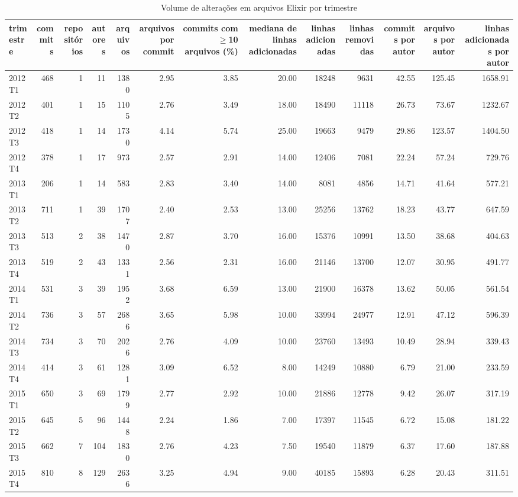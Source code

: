 \begin{table}[htbp]
\centering
\caption{Volume de alterações em arquivos Elixir por trimestre}
\label{tab:volume_trimestres}
\begin{tabular}{lrrrrrrrrrrrr}
\toprule
trimestre & commits & repositórios & autores & arquivos & arquivos por commit & commits com $\geq$10 arquivos (\%) & mediana de linhas adicionadas & linhas adicionadas & linhas removidas & commits por autor & arquivos por autor & linhas adicionadas por autor \\
\midrule
2012T1 & 468 & 1 & 11 & 1380 & 2.95 & 3.85 & 20.00 & 18248 & 9631 & 42.55 & 125.45 & 1658.91 \\
2012T2 & 401 & 1 & 15 & 1105 & 2.76 & 3.49 & 18.00 & 18490 & 11118 & 26.73 & 73.67 & 1232.67 \\
2012T3 & 418 & 1 & 14 & 1730 & 4.14 & 5.74 & 25.00 & 19663 & 9479 & 29.86 & 123.57 & 1404.50 \\
2012T4 & 378 & 1 & 17 & 973 & 2.57 & 2.91 & 14.00 & 12406 & 7081 & 22.24 & 57.24 & 729.76 \\
2013T1 & 206 & 1 & 14 & 583 & 2.83 & 3.40 & 14.00 & 8081 & 4856 & 14.71 & 41.64 & 577.21 \\
2013T2 & 711 & 1 & 39 & 1707 & 2.40 & 2.53 & 13.00 & 25256 & 13762 & 18.23 & 43.77 & 647.59 \\
2013T3 & 513 & 2 & 38 & 1470 & 2.87 & 3.70 & 16.00 & 15376 & 10991 & 13.50 & 38.68 & 404.63 \\
2013T4 & 519 & 2 & 43 & 1331 & 2.56 & 2.31 & 16.00 & 21146 & 13700 & 12.07 & 30.95 & 491.77 \\
2014T1 & 531 & 3 & 39 & 1952 & 3.68 & 6.59 & 13.00 & 21900 & 16378 & 13.62 & 50.05 & 561.54 \\
2014T2 & 736 & 3 & 57 & 2686 & 3.65 & 5.98 & 10.00 & 33994 & 24977 & 12.91 & 47.12 & 596.39 \\
2014T3 & 734 & 3 & 70 & 2026 & 2.76 & 4.09 & 10.00 & 23760 & 13493 & 10.49 & 28.94 & 339.43 \\
2014T4 & 414 & 3 & 61 & 1281 & 3.09 & 6.52 & 8.00 & 14249 & 10880 & 6.79 & 21.00 & 233.59 \\
2015T1 & 650 & 3 & 69 & 1799 & 2.77 & 2.92 & 10.00 & 21886 & 12778 & 9.42 & 26.07 & 317.19 \\
2015T2 & 645 & 5 & 96 & 1448 & 2.24 & 1.86 & 7.00 & 17397 & 11545 & 6.72 & 15.08 & 181.22 \\
2015T3 & 662 & 7 & 104 & 1830 & 2.76 & 4.23 & 7.50 & 19540 & 11879 & 6.37 & 17.60 & 187.88 \\
2015T4 & 810 & 8 & 129 & 2636 & 3.25 & 4.94 & 9.00 & 40185 & 15893 & 6.28 & 20.43 & 311.51 \\

\end{tabular}
\end{table}
